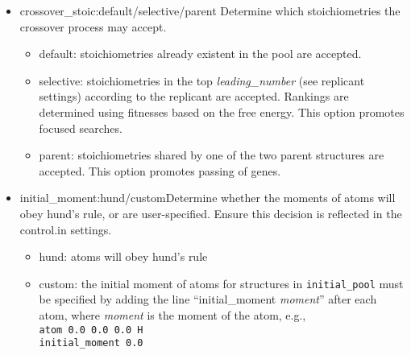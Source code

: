 \begin{itemize}
\item crossover\_stoic:default/selective/parent \newline Determine which stoichiometries the crossover process may accept.
\begin{itemize}
 \item default: stoichiometries already existent in the pool are accepted.
 \item selective: stoichiometries in the top {\em leading\_number} (see replicant settings) according to the replicant are accepted. Rankings are determined using fitnesses based on the free energy. This option promotes focused searches.
 \item parent: stoichiometries shared by one of the two parent structures are accepted. This option promotes passing of genes.
\end{itemize}

\item initial\_moment:hund/custom\newline Determine whether the moments of atoms will obey hund's rule, or are user-specified. Ensure this decision is reflected in the control.in settings.
\begin{itemize}
 \item hund: atoms will obey hund's rule
 \item custom: the initial moment of atoms for structures in \texttt{initial\_pool} must be specified by adding the line ``initial\_moment {\em moment}'' after each atom, where {\em moment} is the moment of the atom, e.g.,\\
\texttt{atom \hspace{7 mm} 0.0 \hspace{7 mm} 0.0 \hspace{7 mm} 0.0 \hspace{7 mm} H}\\
\texttt{initial\_moment \hspace{7 mm} 0.0} 
\end{itemize}

\end{itemize}

